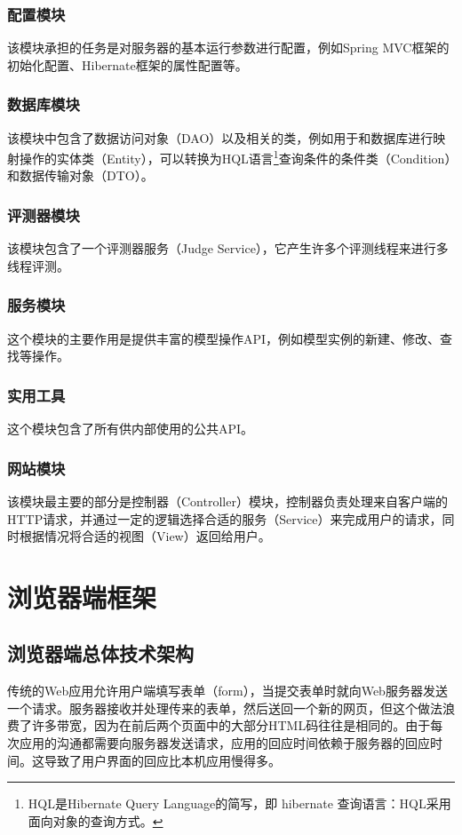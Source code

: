 \subsubsection{配置模块}
该模块承担的任务是对服务器的基本运行参数进行配置，例如Spring MVC框架的初始化配置、Hibernate框架的属性配置等。

\subsubsection{数据库模块}
该模块中包含了数据访问对象（DAO）以及相关的类，例如用于和数据库进行映射操作的实体类（Entity），可以转换为HQL语言\footnote{HQL是Hibernate Query Language的简写，即 hibernate 查询语言：HQL采用面向对象的查询方式。}查询条件的条件类（Condition）和数据传输对象（DTO）。

\subsubsection{评测器模块}
该模块包含了一个评测器服务（Judge Service），它产生许多个评测线程来进行多线程评测。

\subsubsection{服务模块}
这个模块的主要作用是提供丰富的模型操作API，例如模型实例的新建、修改、查找等操作。

\subsubsection{实用工具}
这个模块包含了所有供内部使用的公共API。

\subsubsection{网站模块}
该模块最主要的部分是控制器（Controller）模块，控制器负责处理来自客户端的HTTP请求，并通过一定的逻辑选择合适的服务（Service）来完成用户的请求，同时根据情况将合适的视图（View）返回给用户。

\section{浏览器端框架}
\subsection{浏览器端总体技术架构}
传统的Web应用允许用户端填写表单（form），当提交表单时就向Web服务器发送一个请求。服务器接收并处理传来的表单，然后送回一个新的网页，但这个做法浪费了许多带宽，因为在前后两个页面中的大部分HTML码往往是相同的。由于每次应用的沟通都需要向服务器发送请求，应用的回应时间依赖于服务器的回应时间。这导致了用户界面的回应比本机应用慢得多。

